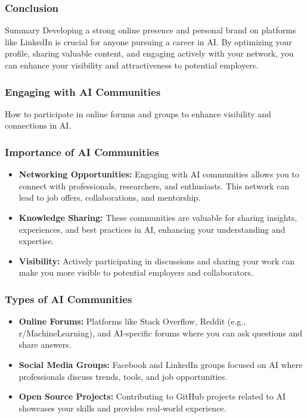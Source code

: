 \documentclass{beamer}
\begin{document}
\begin{frame}[fragile]
    \frametitle{Conclusion}
    \begin{block}{Summary}
        Developing a strong online presence and personal brand on platforms like LinkedIn is crucial for anyone pursuing a career in AI. 
        By optimizing your profile, sharing valuable content, and engaging actively with your network, you can enhance your visibility and attractiveness to potential employers.
    \end{block}
\end{frame}

\begin{frame}[fragile]
    \frametitle{Engaging with AI Communities}
    How to participate in online forums and groups to enhance visibility and connections in AI.
\end{frame}

\begin{frame}[fragile]
    \frametitle{Importance of AI Communities}
    \begin{itemize}
        \item \textbf{Networking Opportunities:} 
            Engaging with AI communities allows you to connect with professionals, researchers, and enthusiasts. This network can lead to job offers, collaborations, and mentorship.
        \item \textbf{Knowledge Sharing:} 
            These communities are valuable for sharing insights, experiences, and best practices in AI, enhancing your understanding and expertise.
        \item \textbf{Visibility:} 
            Actively participating in discussions and sharing your work can make you more visible to potential employers and collaborators.
    \end{itemize}
\end{frame}

\begin{frame}[fragile]
    \frametitle{Types of AI Communities}
    \begin{itemize}
        \item \textbf{Online Forums:} 
            Platforms like Stack Overflow, Reddit (e.g., r/MachineLearning), and AI-specific forums where you can ask questions and share answers.
        \item \textbf{Social Media Groups:} 
            Facebook and LinkedIn groups focused on AI where professionals discuss trends, tools, and job opportunities.
        \item \textbf{Open Source Projects:} 
            Contributing to GitHub projects related to AI showcases your skills and provides real-world experience.
    \end{itemize}
\end{frame}
\end{document}
